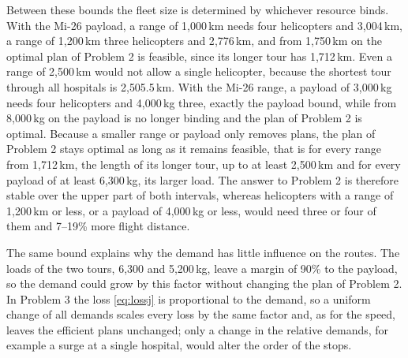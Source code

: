 \documentclass[11pt,a4paper]{article}
\theoremstyle{definition}
\begin{document}
Between these bounds the fleet size is determined by whichever resource binds.
With the Mi-26 payload, a range of 1{,}000\,km needs four helicopters and 3{,}004\,km, a range of 1{,}200\,km three helicopters and 2{,}776\,km, and from 1{,}750\,km on the optimal plan of Problem 2 is feasible, since its longer tour has 1{,}712\,km.
Even a range of 2{,}500\,km would not allow a single helicopter, because the shortest tour through all hospitals is 2{,}505.5\,km.
With the Mi-26 range, a payload of 3{,}000\,kg needs four helicopters and 4{,}000\,kg three, exactly the payload bound, while from 8{,}000\,kg on the payload is no longer binding and the plan of Problem 2 is optimal.
Because a smaller range or payload only removes plans, the plan of Problem 2 stays optimal as long as it remains feasible, that is for every range from 1{,}712\,km, the length of its longer tour, up to at least 2{,}500\,km and for every payload of at least 6{,}300\,kg, its larger load.
The answer to Problem 2 is therefore stable over the upper part of both intervals, whereas helicopters with a range of 1{,}200\,km or less, or a payload of 4{,}000\,kg or less, would need three or four of them and 7--19\% more flight distance.

The same bound explains why the demand has little influence on the routes.
The loads of the two tours, 6{,}300 and 5{,}200\,kg, leave a margin of 90\% to the payload, so the demand could grow by this factor without changing the plan of Problem 2.
In Problem 3 the loss \eqref{eq:lossj} is proportional to the demand, so a uniform change of all demands scales every loss by the same factor and, as for the speed, leaves the efficient plans unchanged; only a change in the relative demands, for example a surge at a single hospital, would alter the order of the stops.
\end{document}

